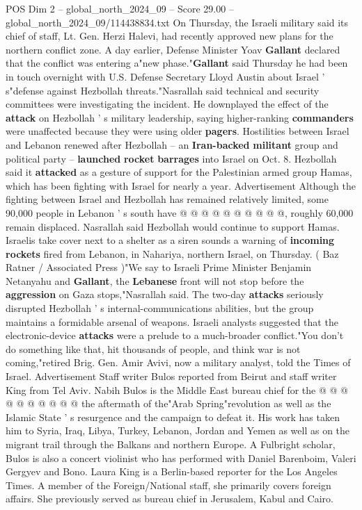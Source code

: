 \begin{textsample}{POS Dim 2 – global\_north\_2024\_09 – Score 29.00 – global\_north\_2024\_09/114438834.txt}
On Thursday, the Israeli military said its chief of staff, Lt.
Gen.
Herzi Halevi, had recently approved new plans for the northern conflict zone.
A day earlier, Defense Minister Yoav \textbf{Gallant} declared that the conflict was entering a"new phase."\textbf{Gallant} said Thursday he had been in touch overnight with U.S.
Defense Secretary Lloyd Austin about Israel ' s"defense against Hezbollah threats."Nasrallah said technical and security committees were investigating the incident.
He downplayed the effect of the \textbf{attack} on Hezbollah ' s military leadership, saying higher-ranking \textbf{commanders} were unaffected because they were using older \textbf{pagers}.
Hostilities between Israel and Lebanon renewed after Hezbollah -- an \textbf{Iran-backed} \textbf{militant} group and political party -- \textbf{launched} \textbf{rocket} \textbf{barrages} into Israel on Oct. 8.
Hezbollah said it \textbf{attacked} as a gesture of support for the Palestinian armed group Hamas, which has been fighting with Israel for nearly a year.
Advertisement Although the fighting between Israel and Hezbollah has remained relatively limited, some 90,000 people in Lebanon ' s south have @ @ @ @ @ @ @ @ @ @, roughly 60,000 remain displaced.
Nasrallah said Hezbollah would continue to support Hamas.
Israelis take cover next to a shelter as a siren sounds a warning of \textbf{incoming} \textbf{rockets} fired from Lebanon, in Nahariya, northern Israel, on Thursday. ( Baz Ratner / Associated Press )"We say to Israeli Prime Minister Benjamin Netanyahu and \textbf{Gallant}, the \textbf{Lebanese} front will not stop before the \textbf{aggression} on Gaza stops,"Nasrallah said.
The two-day \textbf{attacks} seriously disrupted Hezbollah ' s internal-communications abilities, but the group maintains a formidable arsenal of weapons.
Israeli analysts suggested that the electronic-device \textbf{attacks} were a prelude to a much-broader conflict."You don't do something like that, hit thousands of people, and think war is not coming,"retired Brig.
Gen.
Amir Avivi, now a military analyst, told the Times of Israel.
Advertisement Staff writer Bulos reported from Beirut and staff writer King from Tel Aviv.
Nabih Bulos is the Middle East bureau chief for the @ @ @ @ @ @ @ @ @ @ the aftermath of the"Arab Spring"revolution as well as the Islamic State ' s resurgence and the campaign to defeat it.
His work has taken him to Syria, Iraq, Libya, Turkey, Lebanon, Jordan and Yemen as well as on the migrant trail through the Balkans and northern Europe.
A Fulbright scholar, Bulos is also a concert violinist who has performed with Daniel Barenboim, Valeri Gergyev and Bono.
Laura King is a Berlin-based reporter for the Los Angeles Times.
A member of the Foreign/National staff, she primarily covers foreign affairs.
She previously served as bureau chief in Jerusalem, Kabul and Cairo.

\end{textsample}
